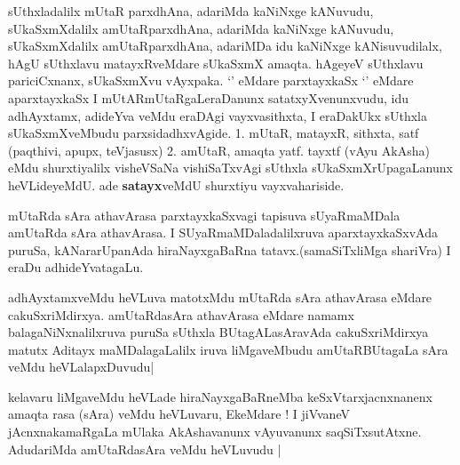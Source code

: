 \begin{artha}
sUthxladalilx mUtaR parxdhAna, adariMda kaNiNxge kANuvudu,
sUkaSxmXdalilx amUtaRparxdhAna, adariMda kaNiNxge kANuvudu,
sUkaSxmXdalilx amUtaRparxdhAna, adariMDa idu kaNiNxge kANisuvudilalx,
hAgU sUthxlavu matayxRveMdare sUkaSxmX amaqta. hAgeyeV sUthxlavu
pariciCxnanx, sUkaSxmXvu vAyxpaka. {`\stext'} eMdare parxtayxkaSx
{`\stext'}  eMdare aparxtayxkaSx I mUtARmUtaRgaLeraDanunx
satatxyXvenunxvudu, idu adhAyxtamx, adideYva veMdu eraDAgi
vayxvasithxta, I eraDakUkx sUthxla sUkaSxmXveMbudu parxsidadhxvAgide.
1. mUtaR, matayxR, sithxta, satf (paqthivi, apupx, teVjasusx)
2. amUtaR, amaqta yatf. tayxtf (vAyu AkAsha)
eMdu shurxtiyalilx visheVSaNa vishiSaTxvAgi sUthxla
sUkaSxmXrUpagaLanunx heVLideyeMdU. ade \textbf{satayx}veMdU shurxtiyu vayxvahariside.
\end{artha}

\begin{center}


\end{center}


\begin{artha}
mUtaRda sAra athavArasa parxtayxkaSxvagi tapisuva sUyaRmaMDala
amUtaRda sAra athavArasa. I SUyaRmaMDaladalilxruva aparxtayxkaSxvAda
puruSa, kANararUpanAda hiraNayxgaBaRna tatavx.(samaSiTxliMga shariVra)
I eraDu adhideYvatagaLu.

adhAyxtamxveMdu heVLuva matotxMdu mUtaRda sAra athavArasa eMdare
cakuSxriMdirxya. amUtaRdasAra athavArasa eMdare namamx
balagaNiNxnalilxruva puruSa sUthxla BUtagALasAravAda cakuSxriMdirxya
matutx Aditayx maMDalagaLalilx iruva liMgaveMbudu amUtaRBUtagaLa sAra
veMdu heVLalapxDuvudu|
\end{artha}

\begin{center}


\end{center}


\begin{artha}
kelavaru liMgaveMdu heVLade hiraNayxgaBaRneMba keSxVtarxjacnxnanenx
amaqta rasa (sAra) veMdu heVLuvaru, EkeMdare ! I jiVvaneV
jAcnxnakamaRgaLa mUlaka AkAshavanunx vAyuvanunx
saqSiTxsutAtxne. AdudariMda amUtaRdasAra veMdu heVLuvudu |
\end{artha}


